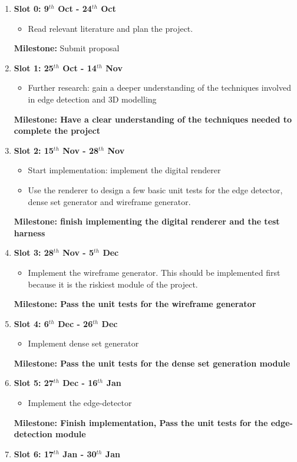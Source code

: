 \begin{enumerate}

\item {\bf Slot 0: 9$^{th}$ Oct - 24$^{th}$ Oct}
	\begin{itemize}
		\item Read relevant literature and plan the project.
	\end{itemize}
	{\bf Milestone:} Submit proposal
\item {\bf Slot 1: 25$^{th}$ Oct - 14$^{th}$ Nov}
	\begin{itemize}
		\item Further research: gain a deeper understanding of the techniques involved in edge detection and 3D modelling
	\end{itemize}
	{\bf Milestone: Have a clear understanding of the techniques needed to complete the project} 
\item {\bf Slot 2: 15$^{th}$ Nov  - 28$^{th}$ Nov}
	\begin{itemize}
		\item Start implementation: implement the digital renderer
		\item Use the renderer to design a few basic unit tests for the edge detector, dense set generator and wireframe generator.
	\end{itemize}
	{\bf Milestone: finish implementing the digital renderer and the test harness}
\item {\bf Slot 3: 28$^{th}$ Nov  - 5$^{th}$ Dec}
\begin{itemize}
		\item Implement the wireframe generator. This should be implemented first because it is the riskiest module of the project. 
	\end{itemize}
	{\bf Milestone: Pass the unit tests for the wireframe generator} 
\item {\bf Slot 4: 6$^{th}$ Dec -  26$^{th}$ Dec}
	\begin{itemize}
		\item Implement dense set generator
	\end{itemize}
	{\bf Milestone: Pass the unit tests for the dense set generation module} 
\item {\bf Slot 5: 27$^{th}$ Dec - 16$^{th}$ Jan}
\begin{itemize}
		\item Implement the edge-detector
	\end{itemize}
	{\bf Milestone: Finish implementation, Pass the unit tests for the edge-detection module} 
\item {\bf Slot 6: 17$^{th}$ Jan  - 30$^{th}$ Jan}

\end{enumerate}

